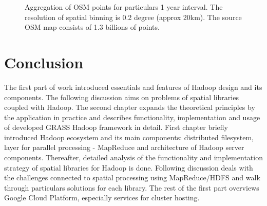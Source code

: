 \documentclass[a4paper,12pt,oneside]{report}
\begin{document}
\begin{figure}[htp]
		\label{figur}\caption{Aggregation of OSM points for particulars 1 year interval. 
		The resolution of spatial binning is 0.2 degree (approx 20km). The source OSM map consists of 1.3 billions of points.
		}
		\label{fig:outmap1}
	\end{figure}
	

	
	\newpage
	\section{Conclusion}
	
	The first part of work introduced essentials and features of Hadoop design and its
	components. The following discussion aims on problems of spatial libraries coupled with Hadoop. 
	The second chapter expands the theoretical principles by the application in practice and describes 
	functionality, implementation and usage of developed GRASS Hadoop framework in detail.
	First chapter briefly introduced Hadoop ecosystem and its main components: distributed filesystem, layer for parallel processing - MapReduce and architecture of Hadoop server components. Thereafter, detailed analysis of the
	functionality and implementation strategy of spatial libraries for Hadoop is
	done. Following discussion deals with the challenges connected to spatial
	processing using MapReduce/HDFS and walk through particulars solutions for each
	library. The rest of the first part overviews Google Cloud Platform, 
	especially services for cluster hosting.
	
\end{document}
